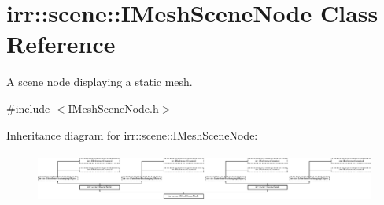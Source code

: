 \hypertarget{classirr_1_1scene_1_1IMeshSceneNode}{}\section{irr\+:\+:scene\+:\+:I\+Mesh\+Scene\+Node Class Reference}
\label{classirr_1_1scene_1_1IMeshSceneNode}


A scene node displaying a static mesh.  




{\ttfamily \#include $<$I\+Mesh\+Scene\+Node.\+h$>$}

Inheritance diagram for irr\+:\+:scene\+:\+:I\+Mesh\+Scene\+Node\+:\begin{figure}[H]
\begin{center}
\leavevmode
\includegraphics[height=1.682692cm]{classirr_1_1scene_1_1IMeshSceneNode}
\end{center}
\end{figure}
